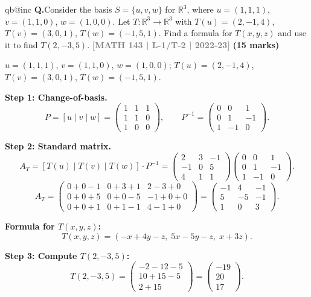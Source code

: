 \documentclass[12pt,a3paper]{article}
\makeatletter
\newcommand{\yr}[1]{\hfill\textcolor{gray}{\small\textbf{[#1]}}}
\newcommand{\mk}[1]{\textcolor{orange!70!black}{\small\textbf{(#1 marks)}}}
\newcounter{qnum}
\newcommand{\Q}[1]{%
  \csname qb@inc\endcsname
  \needspace{4\baselineskip}
  \refstepcounter{qnum}
  \vspace{6pt}
  \noindent\textbf{Q\theqnum.}\enspace #1\par
}
\makeatother
\begin{document}
\Q{Consider the basis $S = \{u,v,w\}$ for $\mathbb{R}^3$, where $u = (1,1,1)$, $v = (1,1,0)$, $w = (1,0,0)$. Let $T: \mathbb{R}^3 \to \mathbb{R}^3$ with $T(u) = (2,-1,4)$, $T(v) = (3,0,1)$, $T(w) = (-1,5,1)$. Find a formula for $T(x,y,z)$ and use it to find $T(2,-3,5)$.
\yr{MATH 143 | L-1/T-2 | 2022-23} \mk{15}}


\begin{tcolorbox}[enhanced,breakable,
  colback=cF!4,colframe=cF,boxrule=0.8pt,arc=5pt,
  title={\textbf{Answer --- $T:\mathbb{R}^3\to\mathbb{R}^3$ from Basis Values; $T(2,-3,5)$}},
  fonttitle=\bfseries\color{white},colbacktitle=cF]

$u=(1,1,1)$, $v=(1,1,0)$, $w=(1,0,0)$; $T(u)=(2,-1,4)$, $T(v)=(3,0,1)$, $T(w)=(-1,5,1)$.

\textbf{Step 1: Change-of-basis.}
\[
P=[u\mid v\mid w]=\begin{pmatrix}1&1&1\\1&1&0\\1&0&0\end{pmatrix},\qquad
P^{-1}=\begin{pmatrix}0&0&1\\0&1&-1\\1&-1&0\end{pmatrix}.
\]

\textbf{Step 2: Standard matrix.}
\[
A_T=[T(u)\mid T(v)\mid T(w)]\cdot P^{-1}=\begin{pmatrix}2&3&-1\\-1&0&5\\4&1&1\end{pmatrix}\begin{pmatrix}0&0&1\\0&1&-1\\1&-1&0\end{pmatrix}.
\]
\[
A_T=\begin{pmatrix}0+0-1&0+3+1&2-3+0\\0+0+5&0+0-5&-1+0+0\\0+0+1&0+1-1&4-1+0\end{pmatrix}=\begin{pmatrix}-1&4&-1\\5&-5&-1\\1&0&3\end{pmatrix}.
\]

\textbf{Formula for $T(x,y,z)$:}
\[
T(x,y,z)=(-x+4y-z,\;5x-5y-z,\;x+3z).
\]

\textbf{Step 3: Compute $T(2,-3,5)$:}
\[
T(2,-3,5)=\begin{pmatrix}-2-12-5\\10+15-5\\2+15\end{pmatrix}=\boxed{\begin{pmatrix}-19\\20\\17\end{pmatrix}}.
\]

\end{tcolorbox}
\end{document}
